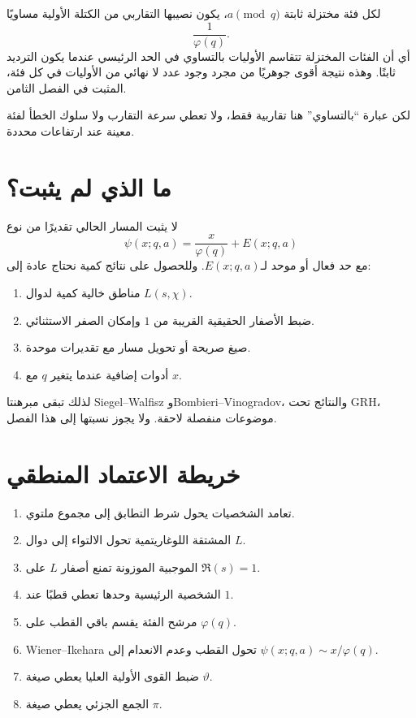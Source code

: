 لكل فئة مختزلة ثابتة \(a\pmod q\)، يكون نصيبها التقاربي من الكتلة
الأولية مساويًا
\[
\frac1{\varphi(q)}.
\]
أي أن الفئات المختزلة تتقاسم الأوليات بالتساوي في الحد الرئيسي عندما يكون
الترديد ثابتًا. وهذه نتيجة أقوى جوهريًا من مجرد وجود عدد لا نهائي من
الأوليات في كل فئة، المثبت في الفصل الثامن.

لكن عبارة ``بالتساوي'' هنا تقاربية فقط، ولا تعطي سرعة التقارب ولا سلوك
الخطأ لفئة معينة عند ارتفاعات محددة.

\section{ما الذي لم يثبت؟}

لا يثبت المسار الحالي تقديرًا من نوع
\[
\psi(x;q,a)
=
\frac{x}{\varphi(q)}+E(x;q,a)
\]
مع حد فعال أو موحد لـ\(E(x;q,a)\). وللحصول على نتائج كمية نحتاج عادة إلى:
\begin{enumerate}
  \item مناطق خالية كمية لدوال \(L(s,\chi)\).
  \item ضبط الأصفار الحقيقية القريبة من \(1\) وإمكان الصفر الاستثنائي.
  \item صيغ صريحة أو تحويل مسار مع تقديرات موحدة.
  \item أدوات إضافية عندما يتغير \(q\) مع \(x\).
\end{enumerate}

لذلك تبقى مبرهنتا Siegel--Walfisz وBombieri--Vinogradov، والنتائج تحت
GRH، موضوعات منفصلة لاحقة. ولا يجوز نسبتها إلى هذا الفصل.

\section{خريطة الاعتماد المنطقي}

\begin{enumerate}
  \item تعامد الشخصيات يحول شرط التطابق إلى مجموع ملتوي.
  \item المشتقة اللوغاريتمية تحول الالتواء إلى دوال \(L\).
  \item الموجبية الموزونة تمنع أصفار \(L\) على \(\Re(s)=1\).
  \item الشخصية الرئيسية وحدها تعطي قطبًا عند \(1\).
  \item مرشح الفئة يقسم باقي القطب على \(\varphi(q)\).
  \item Wiener--Ikehara تحول القطب وعدم الانعدام إلى
  \(\psi(x;q,a)\sim x/\varphi(q)\).
  \item ضبط القوى الأولية العليا يعطي صيغة \(\vartheta\).
  \item الجمع الجزئي يعطي صيغة \(\pi\).
\end{enumerate}

